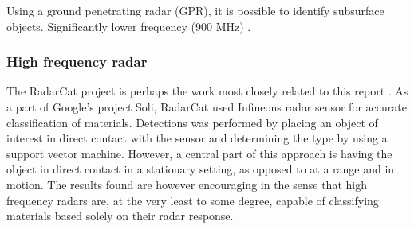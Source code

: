 Using a ground penetrating radar (GPR), it is possible to identify subsurface objects. 
Significantly lower frequency (900 MHz)
\citep{lu_pu_liu_2014}.
\citep{daniels_2004}


\subsubsection{High frequency radar}
The RadarCat project is perhaps the work most closely related to this report \citep{yeo_2016}. As a part of Google's project Soli, RadarCat used Infineons radar sensor for accurate classification of materials. Detections was performed by placing an object of interest in direct contact with the sensor and determining the type by using a support vector machine. However, a central part of this approach is having the object in direct contact in a stationary setting, as opposed to at a range and in motion. The results found are however encouraging in the sense that high frequency radars are, at the very least to some degree, capable of classifying materials based solely on their radar response. 


\iffalse
 of urban environments and automotive radar 
\\ \\
Applications involving millimetre-wave radars and surface recognition is scarce.  
\\ \\
These radars commonly have wavelenghts of something something
\\ \\
If we however want to classify surface materials using a much shorter wavelength, the task changes dramatically as apsorption is near-instant. 
\\ \\
Something about radar wavelenght categories
\\ \\
Furthermore, radar sensors are commonly used in an array setting which permits beamforming and extraction of spatial information. 
\\ \\
If one on the other hand only has a singular radar sensor this is not possible and you must resort to other means.
\\ \\
Probably want something about IQ demodulation somewhere in here.
\fi
